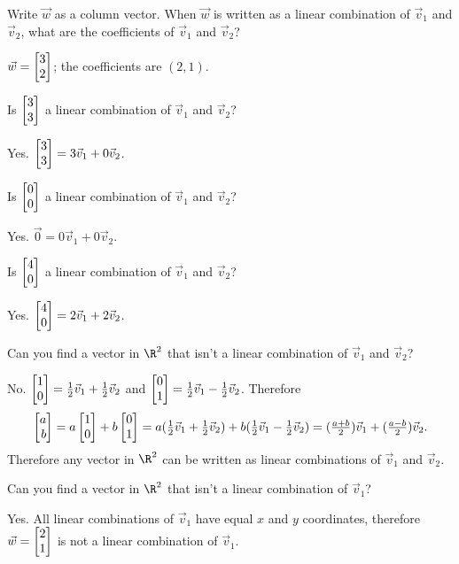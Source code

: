 	\begin{parts}
		\item Write $\vec w$ as a column vector. When $\vec w$ is written as a
			linear combination of $\vec v_1$ and $\vec v_2$, what are the
			coefficients of $\vec v_1$ and $\vec v_2$?
			\begin{solution}
				$\vec w=\mat{3\\2}$; the coefficients are $(2,1)$.
			\end{solution}
		\item Is $\mat{3\\3}$ a linear combination of $\vec v_1$ and $\vec v_2$?
			\begin{solution}[inline]
				Yes. $\mat{3\\3}=3\vec v_1+0\vec v_2$.
			\end{solution}

		\item Is $\mat{0\\0}$ a linear combination of $\vec v_1$ and $\vec v_2$?
			\begin{solution}[inline]
				Yes. $\vec 0=0\vec v_1+0\vec v_2$.
			\end{solution}
		\item Is $\mat{4\\0}$ a linear combination of $\vec v_1$ and $\vec v_2$?
			\begin{solution}[inline]
				Yes. $\mat{4\\0}=2\vec v_1+2\vec v_2$.
			\end{solution}
		\item Can you find a vector in $\R^2$ that isn't a linear combination of
		$\vec v_1$ and $\vec v_2$?
			\begin{solution}
				No. $\mat{1\\0}=\tfrac{1}{2}\vec v_1+\tfrac{1}{2}\vec v_2$ and
				$\mat{0\\1}=\tfrac{1}{2}\vec v_1-\tfrac{1}{2}\vec v_2$.
				Therefore
				\[
					\mat{a\\b}
					= a\mat{1\\0}+b\mat{0\\1}
					= a(\tfrac{1}{2}\vec v_1+\tfrac{1}{2}\vec v_2)
						+b(\tfrac{1}{2}\vec v_1-\tfrac{1}{2}\vec v_2)
					=(\tfrac{a+b}{2})\vec v_1+(\tfrac{a-b}{2})\vec v_2.
				\]
				Therefore any vector in $\R^2$ can be written as linear combinations
				of $\vec v_1$ and $\vec v_2$.
			\end{solution}
		\item Can you find a vector in $\R^2$ that isn't a linear combination of
			$\vec v_1$?
			\begin{solution}
				Yes. All linear combinations of $\vec v_1$ have equal $x$ and
				$y$ coordinates, therefore $\vec w=\mat{2\\1}$ is not a linear
				combination of $\vec v_1$.
			\end{solution}
	\end{parts}


